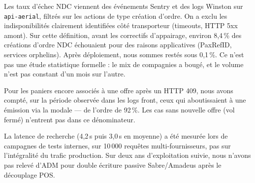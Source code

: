 Les taux d'échec NDC viennent des événements Sentry et des logs Winston sur \texttt{api-aerial}, filtrés sur les actions de type création d'ordre. On a exclu les indisponibilités clairement identifiées côté transporteur (timeouts, HTTP 5xx amont). Sur cette définition, avant les correctifs d'appairage, environ 8,4\,\% des créations d'ordre NDC échouaient pour des raisons applicatives (PaxRefID, services orphelins). Après déploiement, nous sommes restés sous 0,1\,\%. Ce n'est pas une étude statistique formelle : le mix de compagnies a bougé, et le volume n'est pas constant d'un mois sur l'autre.

Pour les paniers encore associés à une offre après un HTTP 409, nous avons compté, sur la période observée dans les logs front, ceux qui aboutissaient à une émission via la modale --- de l'ordre de 92\,\%. Les cas sans nouvelle offre (vol fermé) n'entrent pas dans ce dénominateur.

La latence de recherche (4,2\,s puis 3,0\,s en moyenne) a été mesurée lors de campagnes de tests internes, sur 10\,000 requêtes multi-fournisseurs, pas sur l'intégralité du trafic production. Sur deux ans d'exploitation suivie, nous n'avons pas relevé d'ADM pour double écriture passive Sabre/Amadeus après le découplage POS.
